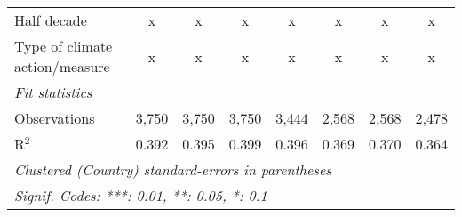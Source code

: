 \begin{tabular}{lccccccc}
   Half decade                                                                        & x              & x              & x              & x              & x             & x             & x\\  
   Type of climate action/measure                                                     & x              & x              & x              & x              & x             & x             & x\\  
   \midrule \emph{Fit statistics}\\
   Observations                                                                       & 3,750          & 3,750          & 3,750          & 3,444          & 2,568         & 2,568         & 2,478\\  
   R$^2$                                                                              & 0.392          & 0.395          & 0.399          & 0.396          & 0.369         & 0.370         & 0.364\\  
   \midrule
   \multicolumn{8}{l}{\emph{Clustered (Country) standard-errors in parentheses}}\\
   \multicolumn{8}{l}{\emph{Signif. Codes: ***: 0.01, **: 0.05, *: 0.1}}\\
\end{tabular}
\par\endgroup


